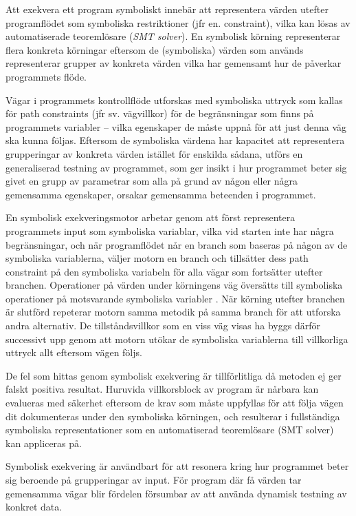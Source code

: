 Att exekvera ett program symboliskt innebär att representera värden utefter 
programflödet som symboliska restriktioner (jfr en. constraint), vilka kan lösas av automatiserade 
teoremlösare (\emph{SMT solver}). En symbolisk körning representerar flera konkreta 
körningar eftersom de (symboliska) värden som används representerar grupper av 
konkreta värden vilka har gemensamt hur de påverkar programmets flöde. 

Vägar i programmets kontrollflöde utforskas med symboliska uttryck som kallas
för path constraints (jfr sv. vägvillkor) för de begränsningar som finns på
programmets variabler -- vilka egenskaper de måste uppnå för att just denna väg
ska kunna följas. Eftersom de symboliska värdena har kapacitet att representera
grupperingar av konkreta värden istället för enskilda sådana, utförs en
generaliserad testning av programmet, som ger insikt i hur programmet beter sig
givet en grupp av parametrar som alla på grund av någon eller några gemensamma
egenskaper, orsakar gemensamma beteenden i programmet. 

En symbolisk exekveringsmotor arbetar genom att först representera programmets
input som symboliska variablar, vilka vid starten inte har några begränsningar,
och när programflödet når en branch som baseras på någon av de symboliska
variablerna, väljer motorn en branch och tillsätter dess path constraint på den
symboliska variabeln för alla vägar som fortsätter utefter branchen. Operationer
på värden under körningens väg översätts till symboliska operationer på
motsvarande symboliska variabler \cite{klee}. När körning utefter branchen är
slutförd repeterar motorn samma metodik på samma branch för att utforska andra
alternativ. De tillståndsvillkor som en viss väg visas ha byggs därför
successivt upp genom att motorn utökar de symboliska variablerna till
villkorliga uttryck allt eftersom vägen följs. 

De fel som hittas genom symbolisk exekvering är tillförlitliga då metoden ej ger falskt 
positiva resultat. Huruvida villkorsblock av program är nårbara kan evalueras med 
säkerhet eftersom de krav som måste uppfyllas för att följa vägen dit dokumenteras under 
den symboliska körningen, och resulterar i fullständiga symboliska representationer 
som en automatiserad teoremlösare (SMT solver) kan appliceras på. 

Symbolisk exekvering är användbart för att resonera kring hur programmet beter sig 
beroende på grupperingar av input. För program där få värden tar gemensamma vägar blir 
fördelen försumbar av att använda dynamisk testning av konkret data. 

